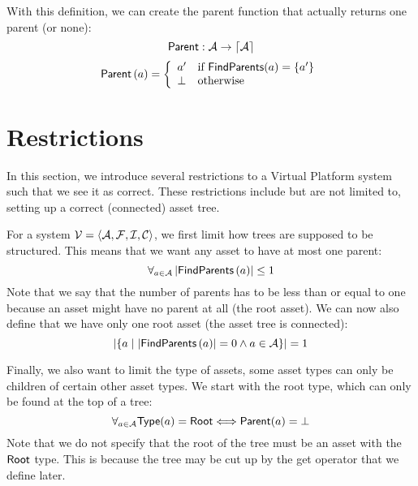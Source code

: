 With this definition, we can create the parent function that actually returns
one parent (or none):
\[
  {\sf Parent} : \mathcal{A} \rightarrow \lceil \mathcal{A} \rceil
\]
\[
  {\sf Parent}\left( a \right) = 
  \left\{ 
    \begin{array}{ll}
      a' & \text{if } {\sf FindParents}(a) = \left\{ a' \right\} \\
      \bot & \text{otherwise}
    \end{array}
  \right.
\]

\section{Restrictions}\label{sec:vp:restrictions}
In this section, we introduce several restrictions to a Virtual Platform
system such that we see it as correct. These restrictions include but are not
limited to, setting up a correct (connected) asset tree.

For a system \( \mathcal{V} = \left< \mathcal{A} , \mathcal{F} , 
\mathcal{I} , \mathcal{C} \right> \), we first limit how trees are
supposed to be structured. This means that we want any asset to have at most
one parent:
\[
  \forall_{a \in \mathcal{A}} \left| {\sf FindParents}\left( a \right) \right| \leq 1
\]
Note that we say that the number of parents has to be less than or equal to
one because an asset might have no parent at all (the root asset). We can now
also define that we have only one root asset (the asset tree is connected):
\[
  \left| \left\{ a \hspace*{1mm} \middle| \hspace*{1mm} \left| {\sf FindParents}\left( a \right) \right| = 0 \land a \in \mathcal{A} \right\} \right| = 1
\]

Finally, we also want to limit the type of assets, some asset types can only
be children of certain other asset types. We start with the root type, which
can only be found at the top of a tree:
\[
  \forall_{a \in \mathcal{A}} {\sf Type}(a) = {\sf Root} \Longleftrightarrow {\sf Parent}(a) = \bot
\]
Note that we do not specify that the root of the tree must be an asset with the
\( {\sf Root} \) type. This is because the tree may be cut up by the get
operator that we define later.

